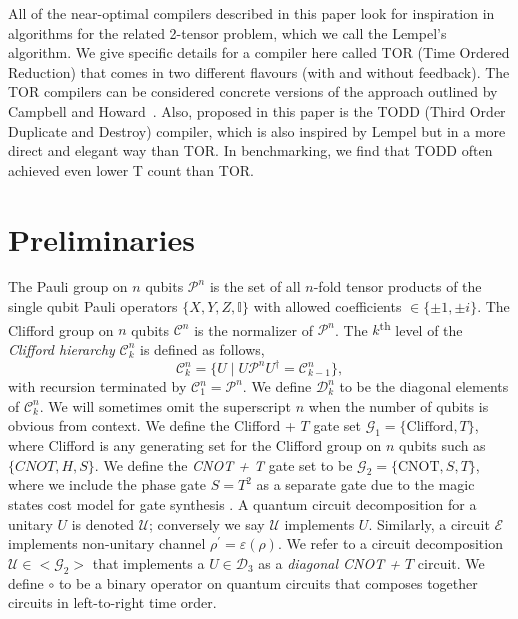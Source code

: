 \documentclass[notitlepage]{article}
\theoremstyle{definition}
\theoremstyle{problem}
\theoremstyle{lemma}
\begin{document}
		All of the near-optimal compilers described in this paper look for inspiration in algorithms for the related 2-tensor problem, which we call the Lempel's algorithm.  We give specific details for a compiler here called TOR (Time Ordered Reduction) that comes in two different flavours (with and without feedback).  The TOR compilers can be considered concrete versions of the approach outlined by Campbell and Howard~\cite{campbell17b}.  Also, proposed in this paper is the TODD (Third Order Duplicate and Destroy) compiler, which is also inspired by Lempel but in a more direct and elegant way than TOR.  In benchmarking, we find that TODD often achieved even lower T count than TOR.  
		
	\FloatBarrier
	
	\section{Preliminaries}	
	The Pauli group on $n$ qubits $\mathcal{P}^n$ is the set of all $n$-fold tensor products of the single qubit Pauli operators $\{X, Y, Z, \mathbb{I}\}$ with allowed coefficients $\in \{\pm1,\pm i\}$.
	The Clifford group on $n$ qubits $\mathcal{C}^n$ is the normalizer of $\mathcal{P}^n$.
	The $k$\textsuperscript{th} level of the \emph{Clifford hierarchy} $\mathcal{C}_k^n$ is defined as follows,
	\begin{equation}
	\label{e_heir}
	\mathcal{C}_k^n = \{U \mid U\mathcal{P}^n U^\dagger = \mathcal{C}_{k-1}^n\},
	\end{equation}
	with recursion terminated by $\mathcal{C}^n_1 = \mathcal{P}^n$.
	We define $\mathcal{D}_k^n$ to be the diagonal elements of $\mathcal{C}_k^n$. We will sometimes omit the superscript $n$ when the number of qubits is obvious from context.
	We define the Clifford + $T$ gate set $\mathcal{G}_1 = \{\mathrm{Clifford}, T\}$, where Clifford is any generating set for the Clifford group on $n$ qubits such as $\{CNOT,H,S\}$.
	We define the \emph{CNOT + T} gate set to be $\mathcal{G}_2 = \{\mathrm{CNOT}, S, T\}$, where we include the phase gate $S=T^2$ as a separate gate due to the magic states cost model for gate synthesis \cite{BraKit05}.
	A quantum circuit decomposition for a unitary $U$ is denoted $\mathcal{U}$; conversely we say $\mathcal{U}$ implements $U$. Similarly, a circuit $\mathcal{E}$ implements non-unitary channel $\rho^\prime = \varepsilon(\rho)$. We refer to a circuit decomposition $\mathcal{U}\in <\mathcal{G}_2>$ that implements a $U\in \mathcal{D}_3$ as a \emph{diagonal CNOT + $T$} circuit. We define $\circ$ to be a binary operator on quantum circuits that composes together circuits in left-to-right time order.
	
\end{document}
